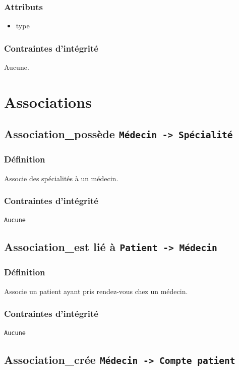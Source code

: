 \documentclass[a4paper, 11pt]{report}
\begin{document}
\subsubsection{Attributs}

\begin{itemize}
    \item type
\end{itemize}

\subsubsection{Contraintes d'intégrité}

Aucune.

\newpage
\section{Associations}

\subsection{Association\_possède \texttt{Médecin -> Spécialité}}
\subsubsection{Définition}
Associe des spécialités à un médecin.
\subsubsection{Contraintes d'intégrité}
\texttt{Aucune}

\subsection{Association\_est lié à \texttt{Patient -> Médecin}}
\subsubsection{Définition}
Associe un patient ayant pris rendez-vous chez un médecin.
\subsubsection{Contraintes d'intégrité}
\texttt{Aucune}

\subsection{Association\_crée \texttt{Médecin -> Compte patient}}
\end{document}
